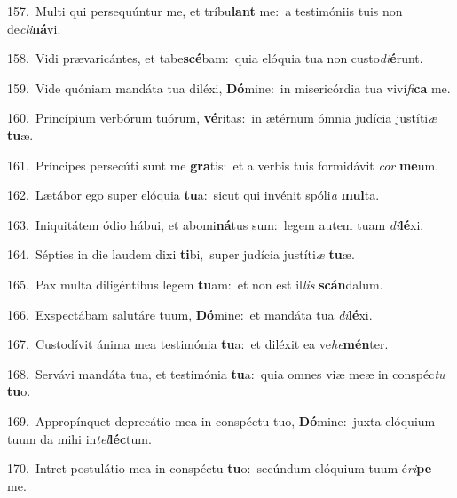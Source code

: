 {\numbfont\textcolor{\numbcolor}{157.}}~Multi qui persequúntur me, et tríbu\textbf{lant} me:~\star a testimóniis tuis non de\-\textit{cli}\-\textbf{ná}vi.\par
{\numbfont\textcolor{\numbcolor}{158.}}~Vidi prævaricántes, et tabe\-\textbf{scé}\-bam:~\star quia elóquia tua non custo\-\textit{di}\-\textbf{é}runt.\par
{\numbfont\textcolor{\numbcolor}{159.}}~Vide quóniam mandáta tua diléxi, \textbf{Dó}\-mine:~\star in misericórdia tua viví\-\textit{fi}\-\textbf{ca} me.\par
{\numbfont\textcolor{\numbcolor}{160.}}~Princípium verbórum tuórum, \textbf{vé}\-ritas:~\star in ætérnum ómnia judícia justíti\textit{æ} \textbf{tu}\-æ.\par
{\numbfont\textcolor{\numbcolor}{161.}}~Príncipes persecúti sunt me \textbf{gra}\-tis:~\star et a verbis tuis formidávit \textit{cor} \textbf{me}\-um.\par
{\numbfont\textcolor{\numbcolor}{162.}}~Lætábor ego super elóquia \textbf{tu}\-a:~\star sicut qui invénit spóli\textit{a} \textbf{mul}\-ta.\par
{\numbfont\textcolor{\numbcolor}{163.}}~Iniquitátem ódio hábui, et abomi\-\textbf{ná}\-tus sum:~\star legem autem tuam \textit{di}\-\textbf{lé}xi.\par
{\numbfont\textcolor{\numbcolor}{164.}}~Sépties in die laudem dixi \textbf{ti}\-bi,~\star super judícia justíti\textit{æ} \textbf{tu}\-æ.\par
{\numbfont\textcolor{\numbcolor}{165.}}~Pax multa diligéntibus legem \textbf{tu}\-am:~\star et non est il\textit{lis} \textbf{scán}\-dalum.\par
{\numbfont\textcolor{\numbcolor}{166.}}~Exspectábam salutáre tuum, \textbf{Dó}\-mine:~\star et mandáta tua \textit{di}\-\textbf{lé}xi.\par
{\numbfont\textcolor{\numbcolor}{167.}}~Custodívit ánima mea testimónia \textbf{tu}\-a:~\star et diléxit ea ve\-\textit{he}\-\textbf{mén}ter.\par
{\numbfont\textcolor{\numbcolor}{168.}}~Servávi mandáta tua, et testimónia \textbf{tu}\-a:~\star quia omnes viæ meæ in conspéc\textit{tu} \textbf{tu}\-o.\par
{\numbfont\textcolor{\numbcolor}{169.}}~Appropínquet deprecátio mea in conspéctu tuo, \textbf{Dó}\-mine:~\star juxta elóquium tuum da mihi in\-\textit{tel}\-\textbf{léc}tum.\par
{\numbfont\textcolor{\numbcolor}{170.}}~Intret postulátio mea in conspéctu \textbf{tu}\-o:~\star secúndum elóquium tuum é\-\textit{ri}\-\textbf{pe} me.\par
